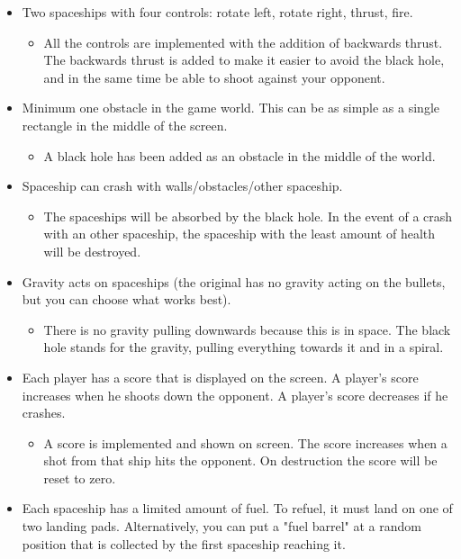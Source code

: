 \documentclass{article}
\begin{document}
\begin{itemize}
	\item Two spaceships with four controls: rotate left, rotate right, thrust, fire.
	\begin{itemize}
		\item All the controls are implemented with the addition of backwards thrust. The backwards thrust is added to make it easier to avoid the black hole, and in the same time be able to shoot against your opponent.
	\end{itemize}
	\item Minimum one obstacle in the game world. This can be as simple as a single rectangle in the middle of the screen.
	\begin{itemize}
		\item A black hole has been added as an obstacle in the middle of the world.
	\end{itemize}
	\item Spaceship can crash with walls/obstacles/other spaceship.
	\begin{itemize}
		\item The spaceships will be absorbed by the black hole. In the event of a crash with an other spaceship, the spaceship with the least amount of health will be destroyed.
	\end{itemize}
	\item Gravity acts on spaceships (the original has no gravity acting on the
	bullets, but you can choose what works best).
	\begin{itemize}
		\item There is no gravity pulling downwards because this is in space. The black hole stands for the gravity, pulling everything towards it and in a spiral.
	\end{itemize}
	\item Each player has a score that is displayed on the screen. A player's score increases when he shoots down the opponent. A player's score decreases if he crashes.
	\begin{itemize}
		\item A score is implemented and shown on screen. The score increases when a shot from that ship hits the opponent. On destruction the score will be reset to zero.
	\end{itemize}
	\item  Each spaceship has a limited amount of fuel. To refuel, it must land on one of two landing pads. Alternatively, you can put a "fuel barrel" at a random position that is collected by the first spaceship reaching it.

\end{itemize}
\end{document}
